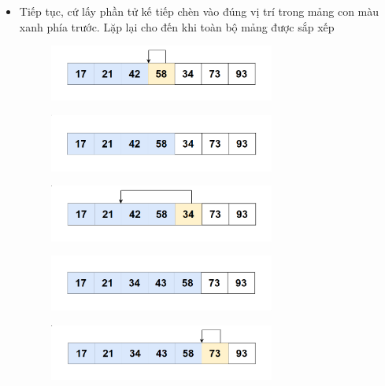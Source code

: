 \newpage

\begin{itemize}
\item Tiếp tục, cứ lấy phần tử kế tiếp chèn vào đúng vị trí trong mảng con màu xanh phía trước. Lặp lại cho đến khi toàn bộ mảng được sắp xếp
    \begin{figure}[H]
        \centering
        \includegraphics[width=0.7\textwidth]{img/insertion sort_lan2/6.png}
    \end{figure}

    \begin{figure}[H]
        \centering
        \includegraphics[width=0.7\textwidth]{img/insertion sort_lan2/7.png}
    \end{figure}

    \begin{figure}[H]
        \centering
        \includegraphics[width=0.7\textwidth]{img/insertion sort_lan2/8.png}
    \end{figure}
    
    \begin{figure}[H]
        \centering
        \includegraphics[width=0.7\textwidth]{img/insertion sort_lan2/9.png}
    \end{figure}

    \begin{figure}[H]
        \centering
        \includegraphics[width=0.7\textwidth]{img/insertion sort_lan2/10.png}
    \end{figure}


\end{itemize}

